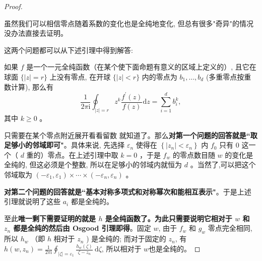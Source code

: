 \documentclass[lang=cn,12pt,fontset=none,a4paper]{beautybook}
\begin{document}
\begin{proof}
\begin{remark}
   虽然我们可以相信零点随着系数的变化也是全纯地变化, 但总有很多"奇异"的情况没办法直接去证明。
\end{remark}

这两个问题都可以从下述引理中得到解答:

\begin{lemma}
   如果 $f$ 是一个一元全纯函数（在某个使下面命题有意义的区域上定义的）, 且它在球面 $\{|z|=r\}$ 上没有零点, 在开球 $\{|z|<r\}$ 内的零点为 $b_1, \ldots, b_d$ (多重零点按重数计算), 那么有 
   $$\frac{1}{2 \pi \mathrm{i}} \oint_{|z|=r} z^k \frac{f^{\prime}(z)}{f(z)} \mathrm{d} z=\sum_{i=1}^d b_i^k,$$
   其中 $k \geq 0$ 。
\end{lemma}


   只需要在某个零点附近展开看看留数 就知道了。那么\textbf{对第一个问题的回答就是``取足够小的邻域即可"}。具体来说, 先选择 $\varepsilon_n$ 使得在 $\left\{\left|z_n\right|<\varepsilon_n\right\}$ 内 $f_0$ 只有 0 这一个（ $d$ 重的）零点。在上述引理中取 $k=0$ ，于是 $f_w$ 的零点数目随 $w$ 的变化是全纯的, 但这必须是个整数, 所以在足够小的邻域内就恒为 $d$ 。当然了,可以把这个邻域取为 $\left(-\varepsilon_1, \varepsilon_1\right) \times \cdots \times\left(-\varepsilon_n, \varepsilon_n\right)$ 。

\textbf{对第二个问题的回答就是``基本对称多项式和对称幂次和能相互表示"}。于是上述引理就说明了这些 $a_i$ 都是全纯的。


至此\textbf{唯一剩下需要证明的就是 $h$ 是全纯函数了。为此只需要说明它相对于 $w$ 和 $z_n$ 都是全纯的然后由 Osgood 引理即得}。固定 $w$, 由于 $f_w$ 和 $g_w$ 零点完全相同, 所以 $h_w$ （即 $h$ 相对于 $z_n$ ) 是全纯的; 而对于固定的 $z_n$, 有 $h\left(w, z_n\right)=\frac{1}{2 \pi \mathrm{i}} \oint_{|\zeta|=\varepsilon_1} \frac{h_w(\zeta)}{\zeta-z_n} \mathrm{~d} \zeta$, 所以相对于 $w$也是全纯的。
   
\end{proof}
\end{document}
